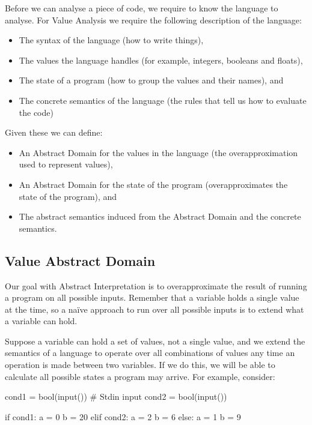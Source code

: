 Before we can analyse a piece of code, we require to know the language
to analyse. For Value Analysis we require the following description of
the language:

\begin{itemize}
\tightlist
\item
  The syntax of the language (how to write things),
\item
  The values the language handles (for example, integers, booleans and
  floats),
\item
  The state of a program (how to group the values and their names), and
\item
  The concrete semantics of the language (the rules that tell us how to
  evaluate the code)
\end{itemize}

Given these we can define:

\begin{itemize}
\tightlist
\item
  An Abstract Domain for the values in the language (the
  overapproximation used to represent values),
\item
  An Abstract Domain for the state of the program (overapproximates the
  state of the program), and
\item
  The abstract semantics induced from the Abstract Domain and the
  concrete semantics.
\end{itemize}

\subsection{Value Abstract Domain}\label{value-abstract-domain}

Our goal with Abstract Interpretation is to overapproximate the result
of running a program on all possible inputs. Remember that a variable
holds a single value at the time, so a naïve approach to run over all
possible inputs is to extend what a variable can hold.

Suppose a variable can hold a set of values, not a single value, and we
extend the semantics of a language to operate over all combinations of
values any time an operation is made between two variables. If we do
this, we will be able to calculate all possible states a program may
arrive. For example, consider:

\begin{pythoncode}
cond1 = bool(input())  # Stdin input
cond2 = bool(input())

if cond1:
  a = 0
  b = 20
elif cond2:
  a = 2
  b = 6
else:
  a = 1
  b = 9
\end{pythoncode}

